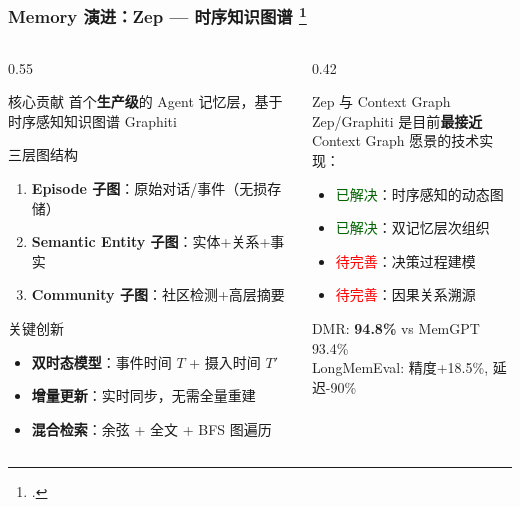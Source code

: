 \documentclass[aspectratio=169,10pt]{beamer}
\let\oldcite\cite
\renewcommand{\cite}[1]{\oldcite{#1}\footcitetext{#1}}
\begin{document}
\begin{frame}
  \frametitle{Memory 演进：Zep --- 时序知识图谱 \cite{rasmussen2025zep}}

  \begin{columns}[T]
    \begin{column}{0.55\textwidth}
      \begin{block}{核心贡献}
        首个\textbf{生产级}的 Agent 记忆层，基于时序感知知识图谱 Graphiti
      \end{block}

      \begin{block}{三层图结构}
        \begin{enumerate}
          \item \textbf{Episode 子图}：原始对话/事件（无损存储）
          \item \textbf{Semantic Entity 子图}：实体+关系+事实
          \item \textbf{Community 子图}：社区检测+高层摘要
        \end{enumerate}
      \end{block}

      \begin{block}{关键创新}
        \begin{itemize}
          \item \textbf{双时态模型}：事件时间 $T$ + 摄入时间 $T'$
          \item \textbf{增量更新}：实时同步，无需全量重建
          \item \textbf{混合检索}：余弦 + 全文 + BFS 图遍历
        \end{itemize}
      \end{block}
    \end{column}

    \begin{column}{0.42\textwidth}
      \begin{alertblock}{Zep 与 Context Graph}
        Zep/Graphiti 是目前\textbf{最接近}\\Context Graph 愿景的技术实现：
        \begin{itemize}
          \item \textcolor{darkgreen}{已解决}：时序感知的动态图
          \item \textcolor{darkgreen}{已解决}：双记忆层次组织
          \item \textcolor{red}{待完善}：决策过程建模
          \item \textcolor{red}{待完善}：因果关系溯源
        \end{itemize}

        \vspace{0.1cm}
        \small
        DMR: \textbf{94.8\%} vs MemGPT 93.4\%\\
        LongMemEval: 精度+18.5\%, 延迟-90\%
      \end{alertblock}
    \end{column}
  \end{columns}
\end{frame}
\end{document}
